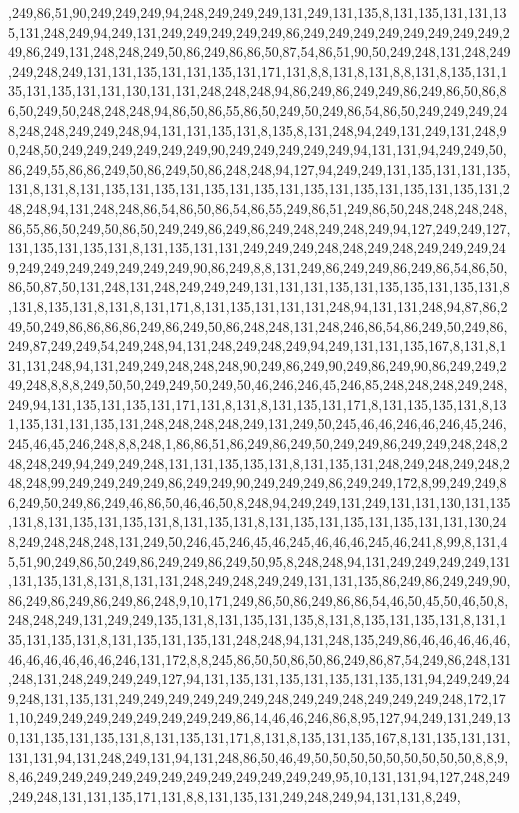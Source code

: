 ,249,86,51,90,249,249,249,94,248,249,249,249,131,249,131,135,8,131,135,131,131,135,131,248,249,94,249,131,249,249,249,249,249,86,249,249,249,249,249,249,249,249,249,86,249,131,248,248,249,50,86,249,86,86,50,87,54,86,51,90,50,249,248,131,248,249,249,248,249,131,131,135,131,131,135,131,171,131,8,8,131,8,131,8,8,131,8,135,131,135,131,135,131,131,130,131,131,248,248,248,94,86,249,86,249,249,86,249,86,50,86,86,50,249,50,248,248,248,94,86,50,86,55,86,50,249,50,249,86,54,86,50,249,249,249,248,248,248,249,249,248,94,131,131,135,131,8,135,8,131,248,94,249,131,249,131,248,90,248,50,249,249,249,249,249,249,90,249,249,249,249,249,94,131,131,94,249,249,50,86,249,55,86,86,249,50,86,249,50,86,248,248,94,127,94,249,249,131,135,131,131,135,131,8,131,8,131,135,131,135,131,135,131,135,131,135,131,135,131,135,131,135,131,248,248,94,131,248,248,86,54,86,50,86,54,86,55,249,86,51,249,86,50,248,248,248,248,86,55,86,50,249,50,86,50,249,249,86,249,86,249,248,249,248,249,94,127,249,249,127,131,135,131,135,131,8,131,135,131,131,249,249,249,248,248,249,248,249,249,249,249,249,249,249,249,249,249,249,90,86,249,8,8,131,249,86,249,249,86,249,86,54,86,50,86,50,87,50,131,248,131,248,249,249,249,131,131,131,135,131,135,135,131,135,131,8,131,8,135,131,8,131,8,131,171,8,131,135,131,131,131,248,94,131,131,248,94,87,86,249,50,249,86,86,86,86,249,86,249,50,86,248,248,131,248,246,86,54,86,249,50,249,86,249,87,249,249,54,249,248,94,131,248,249,248,249,94,249,131,131,135,167,8,131,8,131,131,248,94,131,249,249,248,248,248,90,249,86,249,90,249,86,249,90,86,249,249,249,248,8,8,8,249,50,50,249,249,50,249,50,46,246,246,45,246,85,248,248,248,249,248,249,94,131,135,131,135,131,171,131,8,131,8,131,135,131,171,8,131,135,135,131,8,131,135,131,131,135,131,248,248,248,248,249,131,249,50,245,46,46,246,46,246,45,246,245,46,45,246,248,8,8,248,1,86,86,51,86,249,86,249,50,249,249,86,249,249,248,248,248,248,249,94,249,249,248,131,131,135,135,131,8,131,135,131,248,249,248,249,248,248,248,99,249,249,249,249,86,249,249,90,249,249,249,86,249,249,172,8,99,249,249,86,249,50,249,86,249,46,86,50,46,46,50,8,248,94,249,249,131,249,131,131,130,131,135,131,8,131,135,131,135,131,8,131,135,131,8,131,135,131,135,131,135,131,131,130,248,249,248,248,248,131,249,50,246,45,246,45,46,245,46,46,46,245,46,241,8,99,8,131,45,51,90,249,86,50,249,86,249,249,86,249,50,95,8,248,248,94,131,249,249,249,249,131,131,135,131,8,131,8,131,131,248,249,248,249,249,131,131,135,86,249,86,249,249,90,86,249,86,249,86,249,86,248,9,10,171,249,86,50,86,249,86,86,54,46,50,45,50,46,50,8,248,248,249,131,249,249,135,131,8,131,135,131,135,8,131,8,135,131,135,131,8,131,135,131,135,131,8,131,135,131,135,131,248,248,94,131,248,135,249,86,46,46,46,46,46,46,46,46,46,46,46,246,131,172,8,8,245,86,50,50,86,50,86,249,86,87,54,249,86,248,131,248,131,248,249,249,249,127,94,131,135,131,135,131,135,131,135,131,94,249,249,249,248,131,135,131,249,249,249,249,249,249,248,249,249,248,249,249,249,248,172,171,10,249,249,249,249,249,249,249,249,86,14,46,46,246,86,8,95,127,94,249,131,249,130,131,135,131,135,131,8,131,135,131,171,8,131,8,135,131,135,167,8,131,135,131,131,131,131,94,131,248,249,131,94,131,248,86,50,46,49,50,50,50,50,50,50,50,50,50,8,8,9,8,46,249,249,249,249,249,249,249,249,249,249,249,249,95,10,131,131,94,127,248,249,249,248,131,131,135,171,131,8,8,131,135,131,249,248,249,94,131,131,8,249,